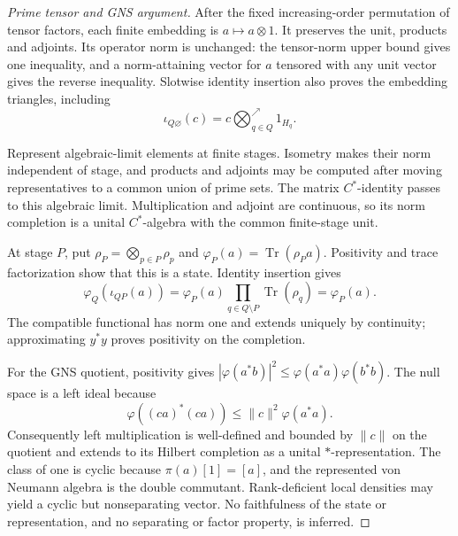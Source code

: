 \begin{proof}[Prime tensor and GNS argument]
After the fixed increasing-order permutation of tensor factors, each finite
embedding is $a\mapsto a\otimes1$. It preserves the unit, products and
adjoints. Its operator norm is unchanged: the tensor-norm upper bound gives
one inequality, and a norm-attaining vector for $a$ tensored with any unit
vector gives the reverse inequality. Slotwise identity insertion also proves
the embedding triangles, including
\[
 \iota_{Q\varnothing}(c)=c\bigotimes_{q\in Q}^{\nearrow}1_{H_q}.
\]

Represent algebraic-limit elements at finite stages. Isometry makes their
norm independent of stage, and products and adjoints may be computed after
moving representatives to a common union of prime sets. The matrix
$C^*$-identity passes to this algebraic limit. Multiplication and adjoint are
continuous, so its norm completion is a unital $C^*$-algebra with the common
finite-stage unit.

At stage $P$, put $\rho_P=\bigotimes_{p\in P}\rho_p$ and
$\varphi_P(a)=\operatorname{Tr}(\rho_Pa)$. Positivity and trace
factorization show that this is a state. Identity insertion gives
\[
 \varphi_Q(\iota_{QP}(a))
 =\varphi_P(a)\prod_{q\in Q\setminus P}\operatorname{Tr}(\rho_q)
 =\varphi_P(a).
\]
The compatible functional has norm one and extends uniquely by continuity;
approximating $y^*y$ proves positivity on the completion.

For the GNS quotient, positivity gives
$|\varphi(a^*b)|^2\leq\varphi(a^*a)\varphi(b^*b)$. The null space is a left
ideal because
\[
 \varphi((ca)^*(ca))\leq\|c\|^2\varphi(a^*a).
\]
Consequently left multiplication is well-defined and bounded by $\|c\|$ on
the quotient and extends to its Hilbert completion as a unital
$*$-representation. The class of one is cyclic because
$\pi(a)[1]=[a]$, and the represented von Neumann algebra is the double
commutant. Rank-deficient local densities may yield a cyclic but
nonseparating vector. No faithfulness of the state or representation, and no
separating or factor property, is inferred.
\end{proof}

